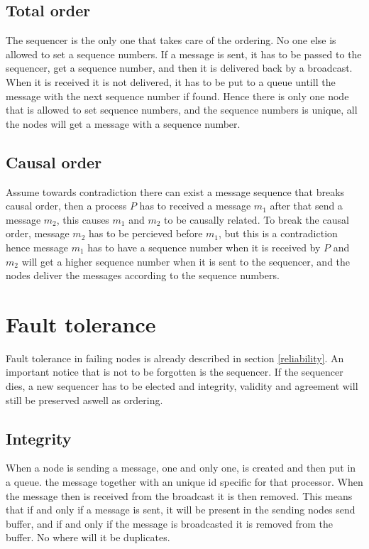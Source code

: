 \documentclass{article}
\begin{document}
\subsection{Total order}
  The sequencer is the only one that takes care of the ordering. 
  No one else is allowed to set a sequence numbers. If a message 
  is sent, it has to be passed to the sequencer, get a sequence 
  number, and then it is delivered back by a broadcast. When it 
  is received it is not delivered, it has to be put to a queue 
  untill the message with the next sequence number if found. 
  Hence there is only one node that is allowed to set sequence 
  numbers, and the  sequence numbers is unique, all the nodes 
  will get a message with a sequence number.
  
\subsection{Causal order}
  Assume towards contradiction there can exist a message sequence
  that breaks causal order, then a process $P$ has to received a message $m_1$
  after that send a message $m_2$, this causes $m_1$ and $m_2$ to be causally
  related. To break the causal order, message $m_2$ has to be percieved before $m_1$, 
  but this is a contradiction hence message $m_1$ has to have a sequence number when 
  it is received by $P$ and $m_2$ will get a higher sequence number when it is sent 
  to the sequencer, and the nodes deliver the messages according to the sequence numbers.
\section{Fault tolerance}
  Fault tolerance in failing nodes is already described in section \ref{reliability}.
  An important notice that is not to be forgotten is the sequencer. If the sequencer 
  dies, a new sequencer has to be elected and integrity, validity and agreement will 
  still be preserved aswell as ordering.
  \subsection{Integrity}
    When a node is sending a message, one and only one, is created and then put in a queue.
    the message together with an unique id specific for that processor. When the message then is 
    received from the broadcast it is then removed. This means that if and only if a message is 
    sent, it    will be present in the sending nodes send buffer, and if and only if the message
    is broadcasted it is removed from the buffer. No where will it be duplicates.
    
\end{document}
